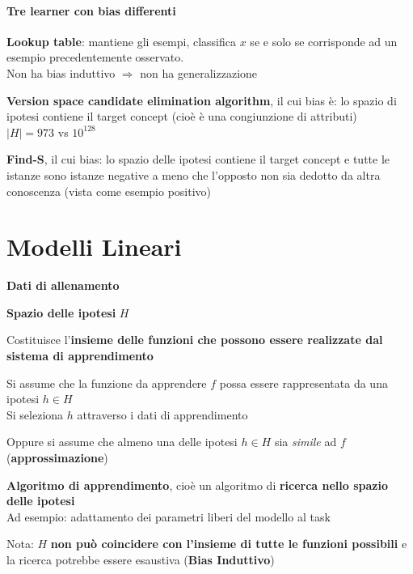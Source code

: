 \documentclass[10pt]{book}
\begin{document}
\paragraph{Tre learner con bias differenti}
\begin{list}{}{}
	\item \textbf{Lookup table}: mantiene gli esempi, classifica $x$ se e solo se corrisponde ad un esempio precedentemente osservato.\\
	Non ha bias induttivo $\Rightarrow$ non ha generalizzazione
	\item \textbf{Version space candidate elimination algorithm}, il cui bias è: lo spazio di ipotesi contiene il target concept (cioè è una congiunzione di attributi)\\$|H| = 973$ vs $10^{128}$	
	\item \textbf{Find-S}, il cui bias: lo spazio delle ipotesi contiene il target concept e tutte le istanze sono istanze negative a meno che l'opposto non sia dedotto da altra conoscenza (vista come esempio positivo)
\end{list}
\pagebreak
\section{Modelli Lineari}
\begin{list}{}{\textbf{Ingredienti}}
	\item \textbf{Dati di allenamento}
	\item \textbf{Spazio delle ipotesi} $H$
	\begin{list}{-}{}
		\item Costituisce l'\textbf{insieme delle funzioni che possono essere realizzate dal sistema di apprendimento}
		\item Si assume che la funzione da apprendere $f$ possa essere rappresentata da una ipotesi $h \in H$\\
		Si seleziona $h$ attraverso i dati di apprendimento
		\item Oppure si assume che almeno una delle ipotesi $h \in H$ sia \textit{simile} ad $f$ (\textbf{approssimazione})
	\end{list}
	\item \textbf{Algoritmo di apprendimento}, cioè un algoritmo di \textbf{ricerca nello spazio delle ipotesi}\\
	Ad esempio: adattamento dei parametri liberi del modello al task
	\item Nota: $H$ \textbf{non può coincidere con l'insieme di tutte le funzioni possibili} e la ricerca potrebbe essere esaustiva (\textbf{Bias Induttivo})
\end{list}
\end{document}
